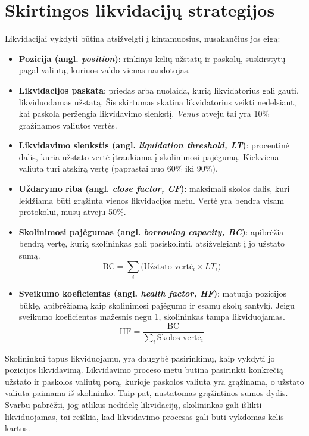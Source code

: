\documentclass{VUMIFPSkursinis}
\begin{document}
\section{Skirtingos likvidacijų strategijos}
\label{sec:liq_strategijos}

Likvidacijai vykdyti būtina atsižvelgti į kintamuosius, nusakančius jos eigą:

\begin{itemize}
  \item \textbf{Pozicija (angl. \textit{position})}: rinkinys kelių užstatų ir paskolų, suskirstytų pagal valiutą, kuriuos valdo vienas naudotojas.
  \item \textbf{Likvidacijos paskata}: priedas arba nuolaida, kurią likvidatorius gali gauti, likviduodamas užstatą.
  Šis skirtumas skatina likvidatorius veikti nedelsiant, kai paskola peržengia likvidavimo slenkstį. \textit{Venus} atveju tai yra 10\% gražinamos valiutos vertės.
  \item \textbf{Likvidavimo slenkstis (angl. \textit{liquidation threshold, LT})}: procentinė dalis, kuria užstato vertė įtraukiama į skolinimosi pajėgumą. Kiekviena valiuta turi atskirą vertę (paprastai nuo 60\% iki 90\%). 
  \item \textbf{Uždarymo riba (angl. \textit{close factor, CF})}: maksimali skolos dalis, kuri leidžiama būti grąžinta vienos likvidacijos metu. Vertė yra bendra visam protokolui, mūsų atveju 50\%.
  \item \textbf{Skolinimosi pajėgumas (angl. \textit{borrowing capacity, BC})}: apibrėžia bendrą vertę, kurią skolininkas gali pasiskolinti, atsižvelgiant į jo užstato sumą.
  \[
    \text{BC} = \sum_{i} \bigl(\text{Užstato vertė}_{i} \times LT_{i}\bigr)
  \]
  \item \textbf{Sveikumo koeficientas (angl. \textit{health factor, HF})}: matuoja pozicijos būklę, apibrėžiamą kaip skolinimosi pajėgumo ir esamų skolų santykį. Jeigu sveikumo koeficientas mažesnis negu 1, skolininkas tampa likviduojamas.
  \[
  \text{HF} = \frac{\text{BC}}{\sum_{i} \text{Skolos vertė}_{i}}
  \]
\end{itemize}

Skolininkui tapus likviduojamu, yra daugybė pasirinkimų, kaip vykdyti jo pozicijos likvidavimą. Likvidavimo proceso metu būtina pasirinkti konkrečią užstato ir paskolos valiutų porą, kurioje paskolos valiuta yra grąžinama, o užstato valiuta paimama iš skolininko. Taip pat, nustatomas grąžintinos sumos dydis. Svarbu pabrėžti, jog atlikus nedidelę likvidaciją, skolininkas gali išlikti likviduojamas, tai reiškia, kad likvidavimo procesas gali būti vykdomas kelis kartus.
\end{document}
